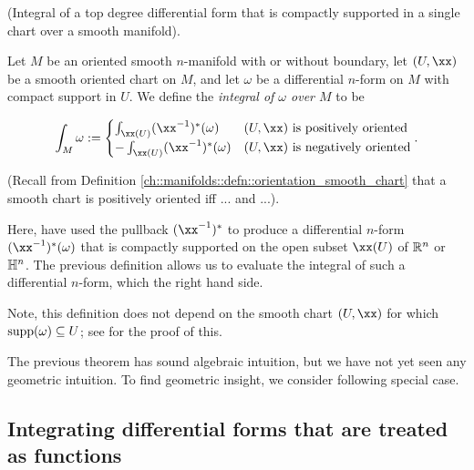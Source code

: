 \begin{defn}
\label{ch::diff_forms::defn::integral_over_single_chart}
     (Integral of a top degree differential form that is compactly supported in a single chart over a smooth manifold).
    
    Let $M$ be an oriented smooth $n$-manifold with or without boundary, let $(U, \xx)$ be a smooth oriented chart on $M$, and let $\omega$ be a differential $n$-form on $M$ with compact support in $U$. We define the \textit{integral of $\omega$ over $M$} to be
    
    \begin{align*}
        \int_M \omega := 
        \begin{cases}
            \int_{\xx(U)} (\xx^{-1})^*(\omega) & \text{$(U, \xx)$ is positively oriented} \\
            -\int_{\xx(U)} (\xx^{-1})^*(\omega) & \text{$(U, \xx)$ is negatively oriented}
        \end{cases}.
    \end{align*}
    
    (Recall from Definition \ref{ch::manifolds::defn::orientation_smooth_chart} that a smooth chart is positively oriented iff ... and ...).
    
    Here, have used the pullback $(\xx^{-1})^*$ to produce a differential $n$-form $(\xx^{-1})^*(\omega)$ that is compactly supported on the open subset $\xx(U)$ of $\mathbb{R}^n$ or $\mathbb{H}^n$. The previous definition allows us to evaluate the integral of such a differential $n$-form, which the right hand side.
    
    Note, this definition does not depend on the smooth chart $(U, \xx)$ for which $\text{supp}(\omega) \subseteq U$; see \cite[p. 404]{book::SM} for the proof of this.
\end{defn}

The previous theorem has sound algebraic intuition, but we have not yet seen any geometric intuition. To find geometric insight, we consider following special case.

\subsection*{Integrating differential forms that are treated as functions}

